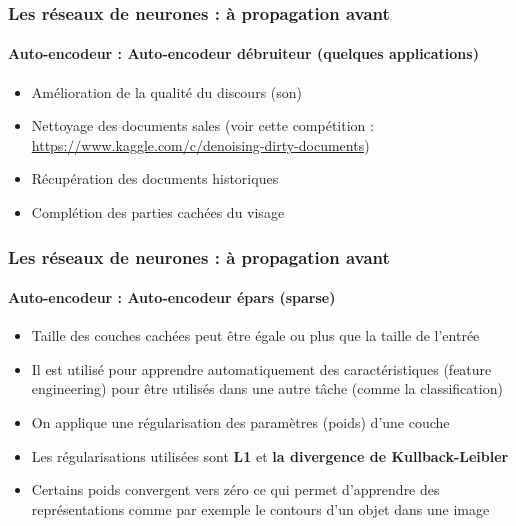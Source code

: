 \documentclass[xcolor=table]{beamer}
\begin{document}
\begin{frame}
\frametitle{Les réseaux de neurones : à propagation avant}
\framesubtitle{Auto-encodeur : Auto-encodeur débruiteur (quelques applications)}

\begin{itemize}
	\item Amélioration de la qualité du discours (son) \cite{2013-lu}
	\item Nettoyage des documents sales (voir cette compétition : \url{https://www.kaggle.com/c/denoising-dirty-documents})
	\item Récupération des documents historiques \cite{2019-neji}
	\item Complétion des parties cachées du visage \cite{2017-li-al}
\end{itemize}

\end{frame}

\begin{frame}
\frametitle{Les réseaux de neurones : à propagation avant}
\framesubtitle{Auto-encodeur : Auto-encodeur épars (sparse)}

\begin{itemize}
	\item Taille des couches cachées peut être égale ou plus que la taille de l'entrée 
	\item Il est utilisé pour apprendre automatiquement des caractéristiques (feature engineering) pour être utilisés dans une autre tâche (comme la classification)
	\item On applique une régularisation des paramètres (poids) d'une couche 
	\item Les régularisations utilisées sont \textbf{L1} et \textbf{la divergence de Kullback-Leibler}
	\item Certains poids convergent vers zéro ce qui permet d'apprendre des représentations comme par exemple le contours d'un objet dans une image
\end{itemize}

\end{frame}
\end{document}
